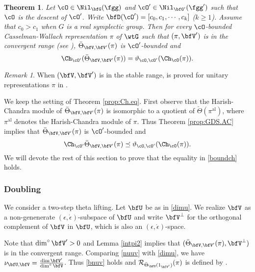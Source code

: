 \documentclass[12pt,a4paper]{amsart}
\newcommand{\mjjc}[1]{\marginpar{\color{green}\tiny #1 \mbox{--ma}}}
\newcommand{\CR}{{\mathcal {R}}}
\numberwithin{equation}{section}
\newtheorem{thm}{Theorem}[section]
\theoremstyle{remark}
\newtheorem*{remark}{Remark}
\def\abfV{\bfV'}
\def\dliftv{\vartheta}
\def\Thetav{\check{\Theta}}
\def\dimo{\dim^\circ}
\def\Thetav{\check{\Theta}}
\def\Thetab{\bar{\Theta}}
\def\acO{{\cO'}}
\begin{document}
\begin{thm}\label{prop:calas}\label{prop:Ch.eq}
Let  $\cO\in \Nil_{\bfG}(\fgg)$ and  $\acO\in \Nil_{\bfG'}(\fgg')$  such that
    $\cO$ is the descent of $\cO'$.  Write $\bfD(\cO') =
    [c_0,c_1, \cdots, c_k]$ ($k\geq 1$).  Assume that
   $c_0> c_1$ when $G$ is a real symplectic group.  Then for every $\cO$-bounded Casselman-Wallach representation $\pi$ of $\wtG$ such that $(\pi, \bfV')$ is in
  the convergent range (see ), $\Thetab_{\bfV,\abfV}(\pi)$ is $\acO$-bounded and
  \begin{equation}\label{eq:LCh}
    \Ch_{\acO}(\Thetab_{\bfV,\abfV}(\pi))= \dliftv_{\cO,\acO} (\Ch_{\cO}(\pi)).
  \end{equation}
\end{thm}
\begin{remark}
  When $(\bfV, \abfV)$ is in the stable range,  is proved for unitary representations $\pi $ in \cite{LM}.
\end{remark}


We keep the setting of Theorem \ref{prop:Ch.eq}. First observe that the Harish-Chandra module of $\Thetab_{\bfV,\abfV}(\pi)$ is isomorphic to a quotient of
$\Thetav(\pi^{\mathrm{al}})$, where $\pi^{\mathrm{al}}$ denotes the  Harish-Chandra module of $\pi$. Thus Theorem \ref{prop:GDS.AC} implies that $\Thetab_{\bfV,\bfV'}(\pi)$ is $\cO'$-bounded and
\begin{equation}\label{boundch}
\Ch_{\acO}\Thetab_{\bfV,\bfV'}(\pi)\preceq \dliftv_{\cO,\cO'}(\Ch_{\cO}(\pi)).
\end{equation}
We will devote the rest of this section to prove that the equality in \eqref{boundch}
holds.

\subsubsection{Doubling}
We consider a two-step theta lifting.
Let $\bfU$ be as in \eqref{dimu}.  We realize $\bfV$ as a non-genenerate
$(\epsilon, \dot \epsilon)$-subspace of $\bfU$ and write $\bfV^\perp$ for the
orthogonal complement of $\bfV$ in $\bfU$, which is also an
$(\epsilon, \dot \epsilon)$-space.

Note that $\dimo \abfV >0$ and Lemma \ref{intpi2} implies that
$(\Thetab_{\bfV, \abfV}(\pi), \bfV^\perp)$ is in the convergent range. Comparing
\eqref{nuuv} with \eqref{dimu}, we have
$\nu_{\bfU,\bfV}=\frac{\dim \abfV}{\dimo \bfV}$. Thus \eqref{bnuv} holds
and $\CR_{\Thetab_{\bfU}(1_{\abfV})}(\pi)$ is defined by .
\end{document}
